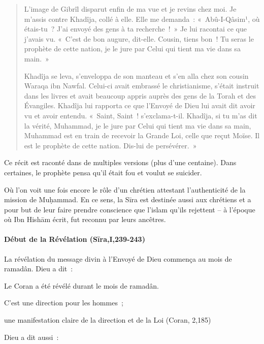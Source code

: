 \begin{quotation}
{L'image de Gibrîl disparut enfin de ma vue et je revins chez moi.
Je m'assis contre Khadîja, collé à elle. Elle me demanda~:
«~Abû-I-Qâsim¹, où étais-tu~? J'ai envoyé des gens à ta recherche~!~» Je
lui racontai ce que j'avais vu. «~C'est de bon augure, dit-elle. Cousin,
tiens bon~! Tu seras le prophète de cette nation, je le jure par Celui
qui tient ma vie dans sa main.~»}

{Khadîja se leva, s'enveloppa de son manteau et s'en alla chez son
cousin Waraqa ibn Nawfal. Celui-ci avait embrassé le christianisme,
s'était instruit dans les livres et avait beaucoup appris auprès des
gens de la Torah et des Évangiles. Khadîja lui rapporta ce que l'Envoyé
de Dieu lui avait dit avoir vu et avoir entendu. «~Saint, Saint~!
s'exclama-t-il. Khadîja, si tu m'as dit la vérité, Muhammad, je le jure
par Celui qui tient ma vie dans sa main, Muhammad est en train de
recevoir la Grande Loi, celle que reçut Moïse. Il est le prophète de
cette nation. Dis-lui de persévérer.~»}
\end{quotation}
Ce récit est raconté dans de multiples versions (plus d'une centaine).
Dans certaines, le prophète pensa qu'il était fou et voulut se suicider.

Où l'on voit une fois encore le rôle d'un chrétien attestant
l'authenticité de la mission de Muḥammad. En ce sens, la Sīra est
destinée aussi aux chrétiens et a pour but de leur faire prendre
conscience que l'islam qu'ils rejettent -- à l'époque où Ibn Hishām
écrit, fut reconnu par leurs ancêtres.



\paragraph{Début de la Révélation
(Sīra,I,239-243)}

La révélation du message divin à l'Envoyé de Dieu commença au mois de
ramadân. Dieu a dit~:

{Le Coran a été révélé durant le mois de ramadân.}

{C'est une direction pour les hommes~;}

{une manifestation claire de la direction et de la Loi (Coran,
2,185)}

{Dieu a dit aussi~:}

